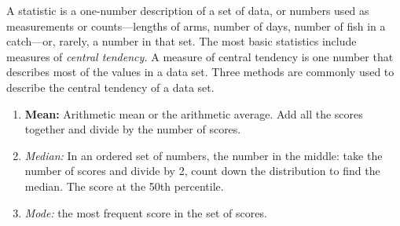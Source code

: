 \documentclass[12pt]{exam}
\newcommand*\AnswerBox[2]{%
    \parbox[t][#1]{0.92\textwidth}{%
    \begin{solution}#2\end{solution}}
}
\begin{document}
\begin{questions}
A statistic is a one-number description of a set of data, or numbers
used as measurements or counts—lengths of arms, number of days, number
of fish in a catch—or, rarely, a number in that set. The most basic statistics 
include measures of \emph{central tendency.} A measure of central tendency 
is one number that describes most of the values in a data set. Three methods 
are commonly used to describe the central tendency of a data set. 

\begin{enumerate}

	\item \textbf{Mean:} Arithmetic mean or the
arithmetic average. Add all the scores together and divide by the number
of scores.

	\item \emph{Median:} In an ordered set of numbers, the number in the middle:
take the number of scores and divide by 2, count down the distribution
to find the median. The score at the 50th percentile.

	\item \emph{Mode:} the most frequent score in the set of
scores.

\end{enumerate}



%
%
% 
% 
%




\end{questions}
\end{document}
